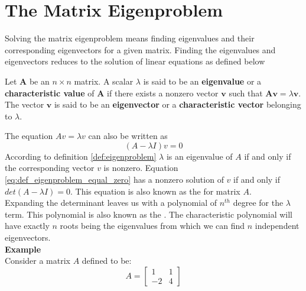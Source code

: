 \section{The Matrix Eigenproblem}
\label{sec:matrix_eigenproblem}
Solving the matrix eigenproblem means finding eigenvalues and
their corresponding eigenvectors for a given matrix. Finding the
eigenvalues and eigenvectors reduces to the solution of linear
equations  as defined below \\

\begin{definition}
\label{def:eigenproblem}
Let $\mathbf{A}$ be an $n \times n$ matrix. A scalar $\lambda$ is said
  to be an \textbf{eigenvalue} or a \textbf{characteristic value} of
  $\mathbf{A}$ if there exists a nonzero vector $\mathbf{v}$ such that
  $\mathbf{A} \mathbf{v} = \lambda \mathbf{v}$. The vector
  $\mathbf{v}$ is said to be an \textbf{eigenvector} or a
    \textbf{characteristic vector} belonging to $\lambda$.
\end{definition}


The equation $A v = \lambda v$ can also be written as
\begin{equation}
\label{eq:def_eigenproblem_equal_zero}
(A - \lambda I) v =  0
\end{equation}
According to definition \vref{def:eigenproblem} $\lambda$ is an eigenvalue of $A$
if and only if the corresponding vector $v$ is nonzero. Equation
\eqref{eq:def_eigenproblem_equal_zero} has a nonzero 
solution of $v$ if and only if $det(A - \lambda I) = 0$.
This equation is
also known as the  for matrix $A$. \\

Expanding the
determinant leaves us with a polynomial of $n^{th}$ degree for the
$\lambda$ term. This polynomial is also known as the
. The characteristic polynomial will have
exactly $n$ roots being the eigenvalues from which we can find $n$
independent eigenvectors. \\

\textbf{Example} \\
Consider a matrix $A$ defined to be:
\begin{equation*}
A = 
\begin{bmatrix} 
  1 & 1 \\ 
  -2 & 4 
\end{bmatrix} 
\end{equation*}

